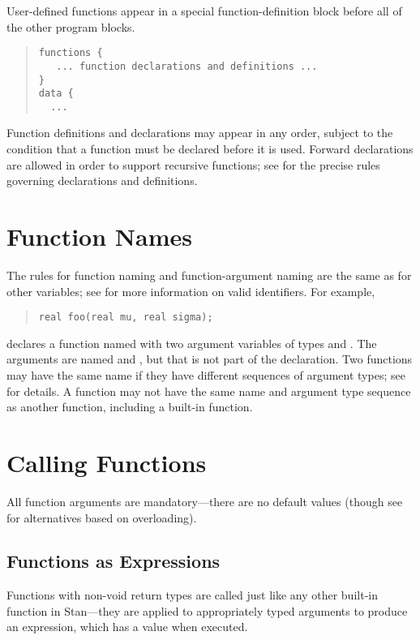 User-defined functions appear in a special function-definition block
before all of the other program blocks. 
%
\begin{quote}
\begin{Verbatim}
functions {
   ... function declarations and definitions ...
}
data { 
  ...
\end{Verbatim}
\end{quote}
%
Function definitions and declarations may appear in any order, subject
to the condition that a function must be declared before it is used.
Forward declarations are allowed in order to support recursive
functions; see  for the precise rules
governing declarations and definitions.

\section{Function Names}

The rules for function naming and function-argument naming are the
same as for other variables; see  for more
information on valid identifiers.  For example,
%
\begin{quote}
\begin{Verbatim}
real foo(real mu, real sigma);
\end{Verbatim}
\end{quote}
%
declares a function named  with two argument variables of
types  and .  The arguments are named 
and , but that is not part of the declaration.  Two
functions may have the same name if they have different sequences of
argument types; see  for details.  A
function may not have the same name and argument type sequence as
another function, including a built-in function.

\section{Calling Functions}

All function arguments are mandatory---there are no default values
(though see  for alternatives based
on overloading).

\subsection{Functions as Expressions}

Functions with non-void return types are called just like any other
built-in function in Stan---they are applied to appropriately typed
arguments to produce an expression, which has a value when executed.

